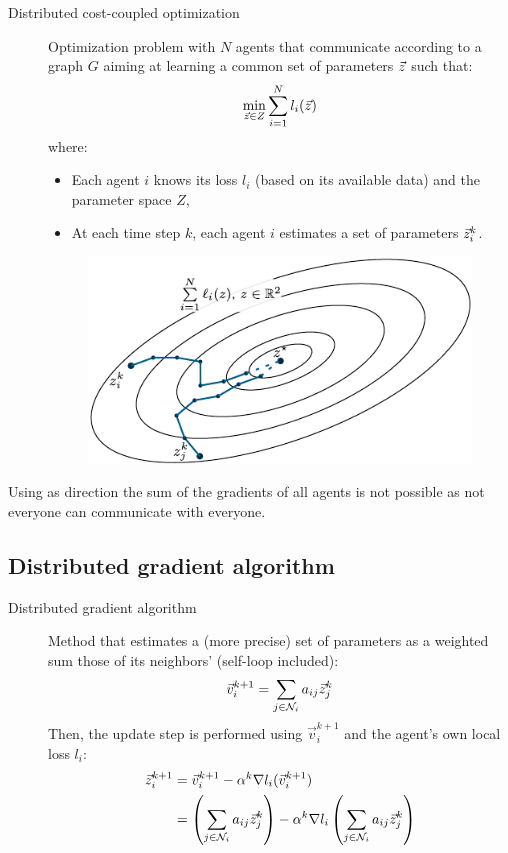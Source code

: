 \begin{description}
    \item[Distributed cost-coupled optimization] 
        Optimization problem with $N$ agents that communicate according to a graph $G$ aiming at learning a common set of parameters ${\vec{z}}$ such that:
        \[
            \min_{{\vec{z}} \in Z} \sum_{i=1}^{N} l_i({\vec{z}})
        \]
        where:
        \begin{itemize}
            \item Each agent $i$ knows its loss $l_i$ (based on its available data) and the parameter space $Z$,
            \item At each time step $k$, each agent $i$ estimates a set of parameters ${\vec{z}}_i^k$.
        \end{itemize}

        \begin{figure}[H]
            \centering
            \includegraphics[width=0.45\linewidth]{./img/_distributed_cost_coupled.pdf}
        \end{figure}
\end{description}

\begin{remark}
    Using as direction the sum of the gradients of all agents is not possible as not everyone can communicate with everyone.
\end{remark}


\subsection{Distributed gradient algorithm}

\begin{description}
    \item[Distributed gradient algorithm] 
        Method that estimates a (more precise) set of parameters as a weighted sum those of its neighbors' (self-loop included):
        \[ 
            \vec{v}_i^{k+1} = \sum_{j \in \mathcal{N}_i} a_{ij} {\vec{z}}_j^k 
        \]
        Then, the update step is performed using $\vec{v}_i^{k+1}$ and the agent's own local loss $l_i$:
        \[
            \begin{split}
                {\vec{z}}_i^{k+1} &= \vec{v}_i^{k+1} - \alpha^k \nabla l_i(\vec{v}_i^{k+1}) \\
                &= \left(\sum_{j \in \mathcal{N}_i} a_{ij} {\vec{z}}_j^k\right) - \alpha^k \nabla l_i\left(\sum_{j \in \mathcal{N}_i} a_{ij} {\vec{z}}_j^k\right)
            \end{split}
        \]
\end{description}

